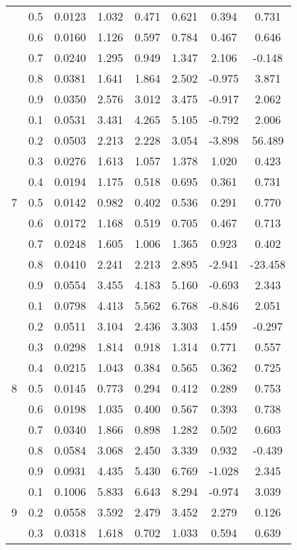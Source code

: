 \documentclass[11pt,a4paper]{report}
\begin{document}
\begin{longtable}{ | c | c || c | c | c | c | c | c | }
 & 0.5 & 0.0123 & 1.032 & 0.471 & 0.621 & 0.394 & 0.731 \\
 & 0.6 & 0.0160 & 1.126 & 0.597 & 0.784 & 0.467 & 0.646 \\
 & 0.7 & 0.0240 & 1.295 & 0.949 & 1.347 & 2.106 & -0.148 \\
 & 0.8 & 0.0381 & 1.641 & 1.864 & 2.502 & -0.975 & 3.871 \\
 & 0.9 & 0.0350 & 2.576 & 3.012 & 3.475 & -0.917 & 2.062 \\
 \hline
\multirow{9}{*}{7} & 0.1 & 0.0531 & 3.431 & 4.265 & 5.105 & -0.792 & 2.006 \\
 & 0.2 & 0.0503 & 2.213 & 2.228 & 3.054 & -3.898 & 56.489 \\
 & 0.3 & 0.0276 & 1.613 & 1.057 & 1.378 & 1.020 & 0.423 \\
 & 0.4 & 0.0194 & 1.175 & 0.518 & 0.695 & 0.361 & 0.731 \\
 & 0.5 & 0.0142 & 0.982 & 0.402 & 0.536 & 0.291 & 0.770 \\
 & 0.6 & 0.0172 & 1.168 & 0.519 & 0.705 & 0.467 & 0.713 \\
 & 0.7 & 0.0248 & 1.605 & 1.006 & 1.365 & 0.923 & 0.402 \\
 & 0.8 & 0.0410 & 2.241 & 2.213 & 2.895 & -2.941 & -23.458 \\
 & 0.9 & 0.0554 & 3.455 & 4.183 & 5.160 & -0.693 & 2.343 \\
 \hline
\multirow{9}{*}{8} & 0.1 & 0.0798 & 4.413 & 5.562 & 6.768 & -0.846 & 2.051 \\
 & 0.2 & 0.0511 & 3.104 & 2.436 & 3.303 & 1.459 & -0.297 \\
 & 0.3 & 0.0298 & 1.814 & 0.918 & 1.314 & 0.771 & 0.557 \\
 & 0.4 & 0.0215 & 1.043 & 0.384 & 0.565 & 0.362 & 0.725 \\
 & 0.5 & 0.0145 & 0.773 & 0.294 & 0.412 & 0.289 & 0.753 \\
 & 0.6 & 0.0198 & 1.035 & 0.400 & 0.567 & 0.393 & 0.738 \\
 & 0.7 & 0.0340 & 1.866 & 0.898 & 1.282 & 0.502 & 0.603 \\
 & 0.8 & 0.0584 & 3.068 & 2.450 & 3.339 & 0.932 & -0.439 \\
 & 0.9 & 0.0931 & 4.435 & 5.430 & 6.769 & -1.028 & 2.345 \\
 \hline
\multirow{9}{*}{9} & 0.1 & 0.1006 & 5.833 & 6.643 & 8.294 & -0.974 & 3.039 \\
 & 0.2 & 0.0558 & 3.592 & 2.479 & 3.452 & 2.279 & 0.126 \\
 & 0.3 & 0.0318 & 1.618 & 0.702 & 1.033 & 0.594 & 0.639 \\

\end{longtable}
\end{document}
